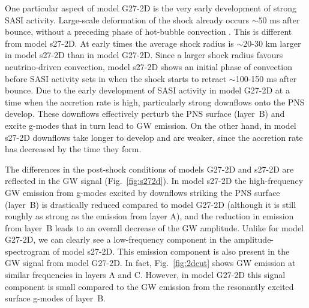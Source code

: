 One particular aspect of model G27-2D is the very early
development of strong SASI activity. Large-scale deformation of the
shock already occurs $\mathord{\sim} 50$ ms after bounce, without a
preceding phase of hot-bubble convection \citep{mueller_13}.  This
is different from model s27-2D.  At early times the
average shock radius is $\sim$20-30 km larger in model s27-2D than
in model G27-2D.  Since a larger shock radius favours neutrino-driven
convection, model s27-2D shows an initial phase of 
convection before SASI activity sets in when the shock starts to
retract $\sim$100-150 ms after bounce.  Due to the early development
of SASI activity in model G27-2D at a time when the accretion rate is high,
particularly strong downflows onto the PNS develop. These downflows
effectively perturb the PNS surface (layer~B) and excite g-modes
that in turn lead to GW emission. On the other hand, in model s27-2D
downflows take longer to develop and are weaker, since the accretion
rate has decreased by the time they form.

The differences in the post-shock conditions of models G27-2D and s27-2D are reflected in the GW signal (Fig.~\ref{fig:s272d}).
In model s27-2D the high-frequency GW emission from g-modes excited by downflows striking the PNS surface (layer~B) is drastically reduced
compared to model G27-2D (although it is still roughly as strong as the emission from layer A), and the reduction in emission from layer~B leads to an overall 
decrease of the GW amplitude. Unlike for model G27-2D, we can clearly see a low-frequency component in the amplitude-spectrogram of model s27-2D.
This emission component is also present in the GW signal from model G27-2D. In fact, Fig.~\ref{fig:2dcut} shows GW emission at similar frequencies in layers A and C. 
However, in model G27-2D this signal component is small compared to the GW emission from the resonantly excited surface g-modes of layer~B.

